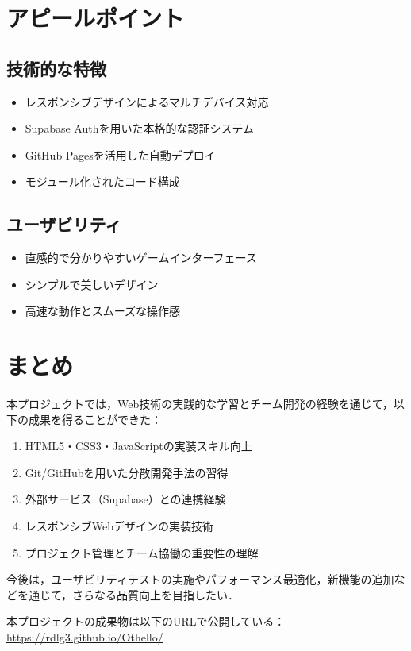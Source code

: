 \documentclass[10pt, a4paper]{jsarticle}
\begin{document}
\section{アピールポイント}

\subsection{技術的な特徴}
\begin{itemize}
    \item レスポンシブデザインによるマルチデバイス対応
    \item Supabase Authを用いた本格的な認証システム
    \item GitHub Pagesを活用した自動デプロイ
    \item モジュール化されたコード構成
\end{itemize}

\subsection{ユーザビリティ}
\begin{itemize}
    \item 直感的で分かりやすいゲームインターフェース
    \item シンプルで美しいデザイン
    \item 高速な動作とスムーズな操作感
\end{itemize}

\section{まとめ}

本プロジェクトでは，Web技術の実践的な学習とチーム開発の経験を通じて，以下の成果を得ることができた：

\begin{enumerate}
    \item HTML5・CSS3・JavaScriptの実装スキル向上
    \item Git/GitHubを用いた分散開発手法の習得
    \item 外部サービス（Supabase）との連携経験
    \item レスポンシブWebデザインの実装技術
    \item プロジェクト管理とチーム協働の重要性の理解
\end{enumerate}

今後は，ユーザビリティテストの実施やパフォーマンス最適化，新機能の追加などを通じて，さらなる品質向上を目指したい．

本プロジェクトの成果物は以下のURLで公開している：
\url{https://rdlg3.github.io/Othello/}
\end{document}
